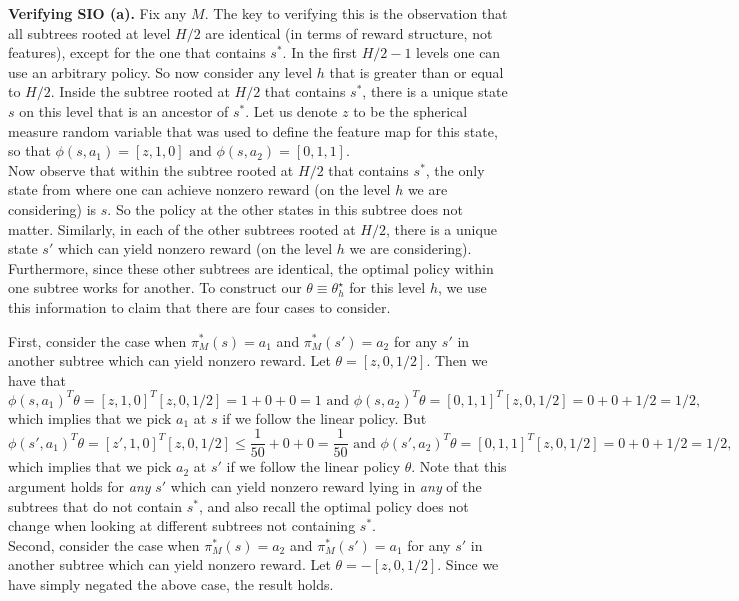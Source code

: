 \documentclass[11pt,twoside]{article}
\begin{document}
\noindent \textbf{Verifying SIO (a).} Fix any $M$. The key to verifying this is the observation that all subtrees rooted at level $H/2$ are identical (in terms of reward structure, not features), except for the one that contains $s^*$. In the first $H/2 - 1$ levels one can use an arbitrary policy. So now consider any level $h$ that is greater than or equal to $H/2$. Inside the subtree rooted at $H/2$ that contains $s^*$, there is a unique state $s$ on this level that is an ancestor of $s^*$. Let us denote $z$ to be the spherical measure random variable that was used to define the feature map for this state, so that $\phi(s, a_1) = [z, 1, 0] \text{ and } \phi(s, a_2) = [0, 1, 1]$. \\

\noindent Now observe that within the subtree rooted at $H/2$ that contains $s^*$, the only state from where one can achieve nonzero reward (on the level $h$ we are considering) is $s$. So the policy at the other states in this subtree does not matter. Similarly, in each of the other subtrees rooted at $H/2$, there is a unique state $s'$ which can yield nonzero reward (on the level $h$ we are considering). Furthermore, since these other subtrees are identical, the optimal policy within one subtree works for another. To construct our $\theta \equiv \theta^\star_h$ for this level $h$, we use this information to claim that there are four cases to consider.

\noindent First, consider the case when $\pi_M^*(s) = a_1$ and $\pi_M^*(s') = a_2$ for any $s'$ in another subtree which can yield nonzero reward. Let $\theta = [z, 0, 1/2]$. Then we have that
$$
\phi(s, a_1)^T \theta = [z, 1, 0]^T [z, 0, 1/2] = 1 + 0 + 0 = 1 \text{ and } \phi(s, a_2)^T \theta = [0, 1, 1]^T [z, 0, 1/2] = 0 + 0 + 1/2 = 1/2,
$$
which implies that we pick $a_1$ at $s$ if we follow the linear policy. But
$$
\phi(s', a_1)^T \theta = [z', 1, 0]^T [z, 0, 1/2] \leq \frac{1}{50} + 0 + 0 = \frac{1}{50} \text{ and } \phi(s', a_2)^T \theta = [0, 1, 1]^T [z, 0, 1/2] = 0 + 0 + 1/2 = 1/2,
$$
which implies that we pick $a_2$ at $s'$ if we follow the linear policy $\theta$. Note that this argument holds for \emph{any} $s'$ which can yield nonzero reward lying in \emph{any} of the subtrees that do not contain $s^*$, and also recall the optimal policy does not change when looking at different subtrees not containing $s^*$. \\

\noindent Second, consider the case when $\pi_M^*(s) = a_2$ and $\pi_M^*(s') = a_1$ for any $s'$ in another subtree which can yield nonzero reward. Let $\theta = -[z, 0, 1/2]$. Since we have simply negated the above case, the result holds. \\
\end{document}
